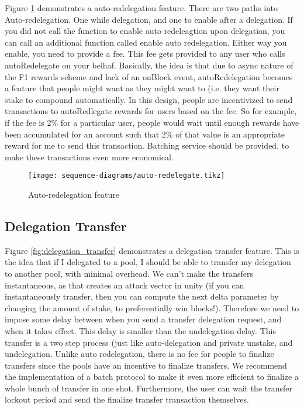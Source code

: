 Figure \ref{fig:redelegation} demonstrates a auto-redelegation feature. There are two paths into Auto-redelegation. One while delegation, and one to enable after a delegation. If you did not call the function to enable auto redeleagtion upon delegation, you can call an additional function called enable auto redelegation. Either way you enable, you need to provide a fee. This fee gets provided to any user who calls autoRedelegate on your belhaf. Basically, the idea is that due to async nature of the F1 rewards scheme and lack of an onBlock event, autoRedelegation becomes a feature that people might want as they might want to  (i.e. they want their stake to compound automatically. In this design, people are incentivized to send transactions to autoRedlegate rewards for users based on the fee. So for example, if the fee is 2\% for a particular user, people would wait until enough rewards have been accumulated for an account such that 2\% of that value is an appropriate reward for me to send this transaction. Batching service should be provided, to make these transactions even more economical. 

\begin{figure}[ht]
\centering
\texttt{[image: sequence-diagrams/auto-redelegate.tikz]}
\caption{Auto-redelegation feature}
\label{fig:redelegation}
\end{figure}
\clearpage

\subsection{Delegation Transfer}

Figure \ref{fig:delegation_transfer} demonstrates a delegation transfer feature. This is the idea that if I delegated to a pool, I should be able to transfer my delegation to another pool, with minimal overhead. We can't make the transfers instantaneous, as that creates an attack vector in unity (if you can instantaneously transfer, then you can compute the next delta parameter by changing the amount of stake, to preferentially win blocks!). Therefore we need to impose some delay between when you send a transfer delegation request, and when it takes effect. This delay is smaller than the undelegation delay. This transfer is a two step process (just like auto-delegation and private unstake, and undelegation. Unlike auto redelegation, there is no fee for people to finalize transfers since the pools have an incentive to finalize transfers. We recommend the implementation of a batch protocol to make it even more efficient to finalize a whole bunch of transfer in one shot. Furthermore, the user can wait the transfer lockout period and send the finalize transfer transaction themselves. 

